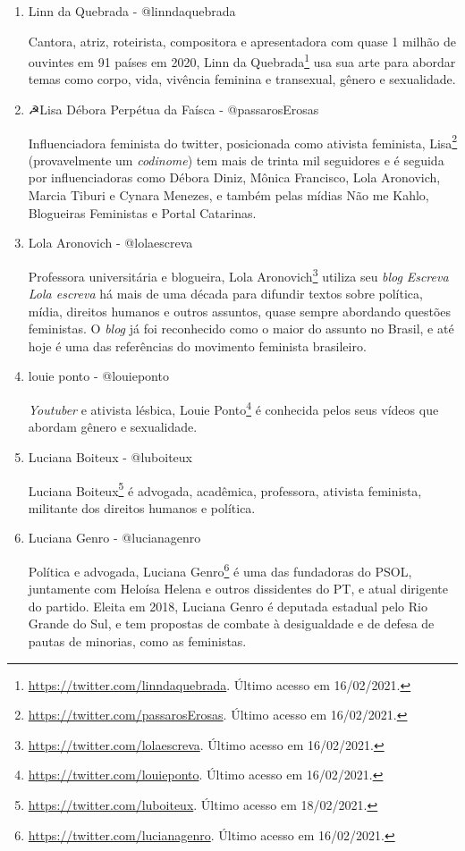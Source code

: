 \documentclass[
	12pt,				%
	openright,			%
	twoside,			%
	a4paper,			%
	english,			%
	brazil				%
	]{abntex2}
\begin{document}
\begin{anexosenv}
\begin{enumerate}
 \item Linn da Quebrada - @linndaquebrada
 
 Cantora, atriz, roteirista, compositora e apresentadora com quase 1 milhão de ouvintes em 91 países em 2020, Linn da Quebrada\footnote{\url{https://twitter.com/linndaquebrada}. Último acesso em 16/02/2021.} usa sua arte para abordar temas como corpo, vida, vivência feminina e transexual, gênero e sexualidade.

 \item $☭$Lisa Débora Perpétua da Faísca - @passarosErosas
 
 Influenciadora feminista do twitter, posicionada como ativista feminista, Lisa\footnote{\url{https://twitter.com/passarosErosas}. Último acesso em 16/02/2021.} (provavelmente um \textit{codinome}) tem mais de trinta mil seguidores e é seguida por influenciadoras como Débora Diniz, Mônica Francisco, Lola Aronovich, Marcia Tiburi e Cynara Menezes, e também pelas mídias Não me Kahlo, Blogueiras Feministas e Portal Catarinas.

 \item Lola Aronovich - @lolaescreva
 
 Professora universitária e blogueira, Lola Aronovich\footnote{\url{https://twitter.com/lolaescreva}. Último acesso em 16/02/2021.} utiliza seu \textit{blog} \textit{Escreva Lola escreva} há mais de uma década para difundir textos sobre política, mídia, direitos humanos e outros assuntos, quase sempre abordando questões feministas. O \textit{blog} já foi reconhecido como o maior do assunto no Brasil, e até hoje é uma das referências do movimento feminista brasileiro.

 \item louie ponto - @louieponto
 
 \textit{Youtuber} e ativista lésbica, Louie Ponto\footnote{\url{https://twitter.com/louieponto}. Último acesso em 16/02/2021.} é conhecida pelos seus vídeos que abordam gênero e sexualidade.

 \item Luciana Boiteux - @luboiteux
 
 Luciana Boiteux\footnote{\url{https://twitter.com/luboiteux}. Último acesso em 18/02/2021.} é advogada, acadêmica, professora, ativista feminista, militante dos direitos humanos e política.

 \item Luciana Genro - @lucianagenro
 
 Política e advogada, Luciana Genro\footnote{\url{https://twitter.com/lucianagenro}. Último acesso em 16/02/2021.} é uma das fundadoras do PSOL, juntamente com Heloísa Helena e outros dissidentes do PT, e atual dirigente do partido. Eleita em 2018, Luciana Genro é deputada estadual pelo Rio Grande do Sul, e tem propostas de combate à desigualdade e de defesa de pautas de minorias, como as feministas.


\end{enumerate}
\end{anexosenv}
\end{document}
